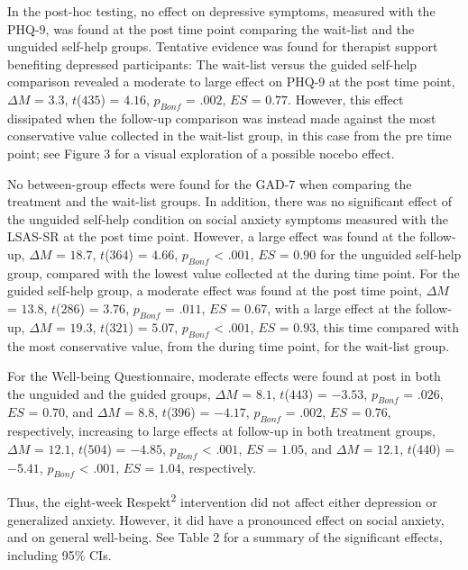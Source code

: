 \documentclass[3p]{elsarticle} %
\begin{document}
In the post-hoc testing, no effect on depressive symptoms, measured with
the PHQ-9, was found at the post time point comparing the wait-list and
the unguided self-help groups. Tentative evidence was found for
therapist support benefiting depressed participants: The wait-list
versus the guided self-help comparison revealed a moderate to large
effect on PHQ-9 at the post time point, \(\Delta M\) = \(3.3\),
\(t\)(\(435\)) = \(4.16\), \(p_{ Bonf }\) = \(.002\), \(ES\) = \(0.77\).
However, this effect dissipated when the follow-up comparison was
instead made against the most conservative value collected in the
wait-list group, in this case from the pre time point; see Figure 3 for
a visual exploration of a possible nocebo effect.

No between-group effects were found for the GAD-7 when comparing the
treatment and the wait-list groups. In addition, there was no
significant effect of the unguided self-help condition on social anxiety
symptoms measured with the LSAS-SR at the post time point. However, a
large effect was found at the follow-up, \(\Delta M\) = \(18.7\),
\(t\)(\(364\)) = \(4.66\), \(p_{ Bonf }\) \textless{} \(.001\), \(ES\) =
\(0.90\) for the unguided self-help group, compared with the lowest
value collected at the during time point. For the guided self-help
group, a moderate effect was found at the post time point, \(\Delta M\)
= \(13.8\), \(t\)(\(286\)) = \(3.76\), \(p_{ Bonf }\) = \(.011\), \(ES\)
= \(0.67\), with a large effect at the follow-up, \(\Delta M\) =
\(19.3\), \(t\)(\(321\)) = \(5.07\), \(p_{ Bonf }\) \textless{}
\(.001\), \(ES\) = \(0.93\), this time compared with the most
conservative value, from the during time point, for the wait-list group.

For the Well-being Questionnaire, moderate effects were found at post in
both the unguided and the guided groups, \(\Delta M\) = \(8.1\),
\(t\)(\(443\)) = \(-3.53\), \(p_{ Bonf }\) = \(.026\), \(ES\) =
\(0.70\), and \(\Delta M\) = \(8.8\), \(t\)(\(396\)) = \(-4.17\),
\(p_{ Bonf }\) = \(.002\), \(ES\) = \(0.76\), respectively, increasing
to large effects at follow-up in both treatment groups, \(\Delta M\) =
\(12.1\), \(t\)(\(504\)) = \(-4.85\), \(p_{ Bonf }\) \textless{}
\(.001\), \(ES\) = \(1.05\), and \(\Delta M\) = \(12.1\), \(t\)(\(440\))
= \(-5.41\), \(p_{ Bonf }\) \textless{} \(.001\), \(ES\) = \(1.04\),
respectively.

Thus, the eight-week Respekt\textsuperscript{2} intervention did not
affect either depression or generalized anxiety. However, it did have a
pronounced effect on social anxiety, and on general well-being. See
Table 2 for a summary of the significant effects, including 95\% CIs.
\end{document}
